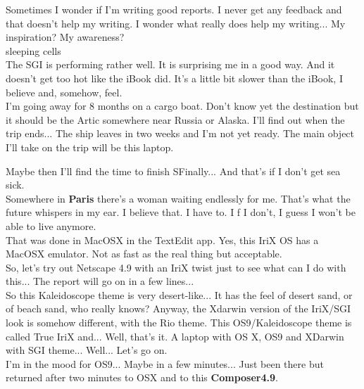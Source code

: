 \documentclass[11pt,twoside,a4paper]{book}
\begin{document}
\begin{multicols*}{2}

Sometimes I wonder if I'm writing good reports. I never get any feedback and that doesn't help my writing. I wonder what really does help my writing... My inspiration? My awareness? ~\\

{\large sleeping cells} ~\\

The SGI is performing rather well. It is surprising me in a good way. And it doesn't get too hot like the iBook did. It's a little bit slower than the iBook, I believe and, somehow, feel. ~\\

I'm going away for 8 months on a cargo boat. Don't know yet the destination but it should be the Artic somewhere near Russia or Alaska. I'll find out when the trip ends... The ship leaves in two weeks and I'm not yet ready. The main object I'll take on the trip will be this laptop. %

Maybe then I'll find the time to finish SFinally... And that's if I don't get sea sick. ~\\

Somewhere in \textbf{Paris} there's a woman waiting endlessly for me. That's what the future whispers in my ear. I believe that. I have to. I f I don't, I guess I won't be able to live anymore. ~\\

That was done in MacOSX in the TextEdit app. Yes, this IriX OS has a MacOSX emulator. Not as fast as the real thing but acceptable. ~\\

So, let's try out Netscape 4.9 with an IriX twist just to see what can I do with this... The report will go on in a few lines... ~\\

So this Kaleidoscope theme is very desert-like... It has the feel of desert sand, or of beach sand, who really knows? Anyway, the Xdarwin version of the IriX/SGI look is somehow different, with the Rio theme. This OS9/Kaleidoscope theme is called True IriX and... Well, that's it. A laptop with OS X, OS9 and XDarwin with SGI theme... Well... Let's go on. ~\\

I'm in the mood for OS9... Maybe in a few minutes... Just been there but returned after two minutes to OSX and to this \textbf{Composer4.9}. ~\\


\end{multicols*}
\end{document}
